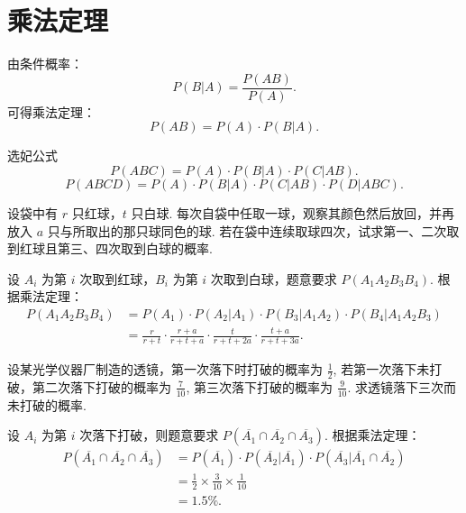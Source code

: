 \documentclass[12pt, a4paper, oneside, UTF8]{ctexbook}
\begin{document}
\section{乘法定理}

由条件概率：
\[P\left(B | A\right) = \frac{P\left(AB\right)}{P\left(A\right)}.\]
可得乘法定理：
\[P\left(AB\right) = P\left(A\right) \cdot P\left(B | A\right).\]

\begin{corollary}{选妃公式}
    \[P\left(ABC\right) = P\left(A\right)\cdot P\left(B | A\right)\cdot P\left(C | AB\right).\]
    \[P\left(ABCD\right) = P\left(A\right)\cdot P\left(B | A\right) \cdot P\left(C | AB\right) \cdot P\left(D | ABC\right).\]
\end{corollary}

\begin{example}
    设袋中有 \(r\) 只红球，\(t\) 只白球. 每次自袋中任取一球，观察其颜色然后放回，并再放入 \(a\) 只与所取出的那只球同色的球. 若在袋中连续取球四次，试求第一、二次取到红球且第三、四次取到白球的概率.
\end{example}

\begin{solution}
    设 \(A_i\) 为第 \(i\) 次取到红球，\(B_i\) 为第 \(i\) 次取到白球，题意要求 \(P\left(A_1 A_2 B_3 B_4\right)\). 根据乘法定理：
    \begin{align*}
        P\left(A_1 A_2 B_3 B_4\right) &= P\left(A_1\right)\cdot P\left(A_2 | A_1\right) \cdot P\left(B_3 | A_1 A_2\right) \cdot P\left(B_4 | A_1 A_2 B_3\right) \\
        &= \frac{r}{r + t} \cdot \frac{r + a}{r + t + a} \cdot \frac{t}{r + t + 2a} \cdot \frac{t + a}{r + t + 3a}.
    \end{align*}
\end{solution}

\begin{example}
    设某光学仪器厂制造的透镜，第一次落下时打破的概率为 \(\frac{1}{2}\), 若第一次落下未打破，第二次落下打破的概率为 \(\frac{7}{10}\), 第三次落下打破的概率为 \(\frac{9}{10}\). 求透镜落下三次而未打破的概率.
\end{example}

\begin{solution}
    设 \(A_i\) 为第 \(i\) 次落下打破，则题意要求 \(P\left(\overline{A_1} \cap \overline{A_2} \cap \overline{A_3}\right)\). 根据乘法定理：
    \begin{align*}
        P\left(\overline{A_1} \cap \overline{A_2} \cap \overline{A_3}\right) &= P\left(\overline{A_1}\right) \cdot P\left(\overline{A_2} | \overline{A_1}\right) \cdot P\left(\overline{A_3} | \overline{A_1} \cap \overline{A_2}\right) \\
        &= \frac{1}{2} \times \frac{3}{10} \times \frac{1}{10} \\
        &= 1.5\%.
    \end{align*}
\end{solution}
\end{document}
